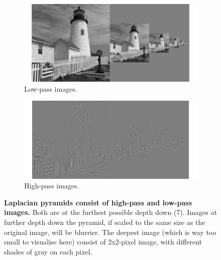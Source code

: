 \documentclass[a4paper, 11pt]{article}
\begin{document}
\begin{center}
\begin{figure}[h]
\begin{center}
	\begin{subfigure}[b]{0.4\textwidth}
		\includegraphics[width=\textwidth]{x_cell_pyramid.jpg}
		\caption{Low-pass images.}
	\end{subfigure}
	\begin{subfigure}[b]{0.4\textwidth}
		\includegraphics[width=\textwidth]{y_cell_pyramid.jpg}
		\caption{High-pass images. }
	\end{subfigure}
	\caption{\textbf{Laplacian pyramids consist of high-pass and low-pass images.} Both are at the furthest possible depth down (7). Images at further depth down the pyramid, if scaled to the same size as the original image, will be blurrier. The deepest image (which is way too small to visualise here) consist of 2x2-pixel image, with different shades of gray on each pixel. }
	\end{center}
\end{figure}
\end{center}
\end{document}
